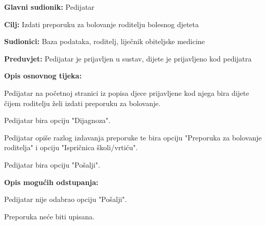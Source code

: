 					
					\noindent {}
					\begin{packed_item}
						
						\item \textbf{Glavni sudionik: }Pedijatar
						\item  \textbf{Cilj:} Izdati preporuku za bolovanje roditelju bolesnog djeteta
						\item  \textbf{Sudionici:} Baza podataka, roditelj, liječnik obiteljske medicine
						\item  \textbf{Preduvjet:} Pedijatar je prijavljen u sustav, dijete je prijavljeno kod pedijatra
						\item  \textbf{Opis osnovnog tijeka:}
						
						\item[] \begin{packed_enum}
							
							\item Pedijatar na početnoj stranici iz popisa djece prijavljene kod njega bira dijete čijem roditelju želi izdati preporuku za bolovanje.
							\item Pedijatar bira opciju "Dijagnoza".
							\item Pedijatar opiše razlog izdavanja preporuke te bira opciju "Preporuka za bolovanje roditelja" i opciju "Ispričnica školi/vrtiću".
							\item Pedijatar bira opciju "Pošalji".
						\end{packed_enum}
						
						\item  \textbf{Opis mogućih odstupanja:}
						
						\item[] \begin{packed_item}
							
							\item[4.a] Pedijatar nije odabrao opciju "Pošalji".
							\item[] \begin{packed_enum}
								
								\item Preporuka neće biti upisana.
							\end{packed_enum}
							
							
						\end{packed_item}
						
						
					\end{packed_item}
					
